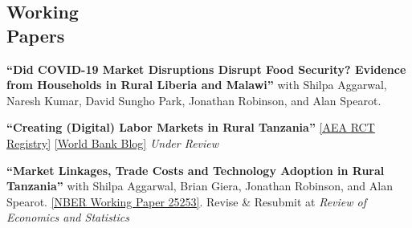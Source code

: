 \documentclass[letterpaper, margin, 10pt]{res} %
\begin{document}
\begin{resume}
\normalsize\section{\textbf{Working \\ Papers}}
\normalsize 
{\bf ``{Did COVID-19 Market Disruptions Disrupt Food Security? Evidence from Households in Rural Liberia and Malawi}''} with Shilpa Aggarwal, Naresh Kumar, David Sungho Park, Jonathan Robinson, and Alan Spearot.

\normalsize 
{\bf ``{Creating (Digital) Labor Markets in Rural Tanzania}''} \href{https://www.socialscienceregistry.org/trials/4483}{{[AEA RCT Registry]}} \href{https://blogs.worldbank.org/impactevaluations/using-sms-transform-agricultural-labor-markets-tanzania-guest-post-dahyeon-jeong}{{[World Bank Blog]}} \textit{Under Review}

\normalsize
{\bf ``{Market Linkages, Trade Costs and Technology Adoption in Rural Tanzania}''} with Shilpa Aggarwal, Brian Giera, Jonathan Robinson, and Alan Spearot. \href{https://www.nber.org/papers/w25253.pdf}{[NBER Working Paper 25253]}. Revise \& Resubmit at \textit{Review of Economics and Statistics}



\end{resume}
\end{document}

